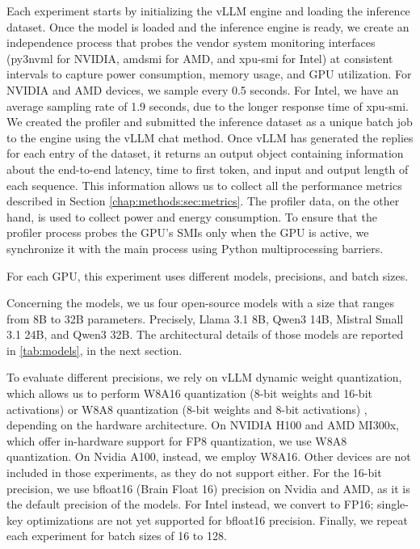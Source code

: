 Each experiment starts by initializing the vLLM engine and loading the inference dataset.
Once the model is loaded and the inference engine is ready, we create an independence process that probes the vendor system monitoring interfaces (py3nvml for NVIDIA, amdsmi for AMD, and xpu-smi for Intel) at consistent intervals to capture power consumption, memory usage, and GPU utilization. For NVIDIA and AMD devices, we sample every 0.5 seconds. For Intel, we have an average sampling rate of 1.9 seconds, due to the longer response time of xpu-smi.
We created the profiler and submitted the inference dataset as a unique batch job to the engine using the vLLM chat method.
Once vLLM has generated the replies for each entry of the dataset, it returns an output object containing information about the end-to-end latency, time to first token, and input and output length of each sequence. This information allows us to collect all the performance metrics described in Section \ref{chap:methods:sec:metrics}.
The profiler data, on the other hand, is used to collect power and energy consumption. To ensure that the profiler process probes the GPU's SMIs only when the GPU is active, we synchronize it with the main process using Python multiprocessing barriers.

For each GPU, this experiment uses different models, precisions, and batch sizes.

Concerning the models, we us four open-source models with a size that ranges from 8B to 32B parameters. Precisely, Llama 3.1 8B, Qwen3 14B, Mistral Small 3.1 24B, and Qwen3 32B. The architectural details of those models are reported in \ref{tab:models}, in the next section.

To evaluate different precisions, we rely on vLLM dynamic weight quantization, which allows us to perform W8A16 quantization (8-bit weights and 16-bit activations) or W8A8 quantization (8-bit weights and 8-bit activations) \cite{vllm-fp8-docs-v0_5_4}, depending on the hardware architecture.
On NVIDIA H100 and AMD MI300x, which offer in-hardware support for FP8 quantization, we use W8A8 quantization. On Nvidia A100, instead, we employ W8A16. Other devices are not included in those experiments, as they do not support either.
For the 16-bit precision, we use bfloat16 (Brain Float 16) precision on Nvidia and AMD, as it is the default precision of the models. For Intel instead, we convert to FP16; single-key optimizations are not yet supported for bfloat16 precision.
Finally, we repeat each experiment for batch sizes of 16 to 128.